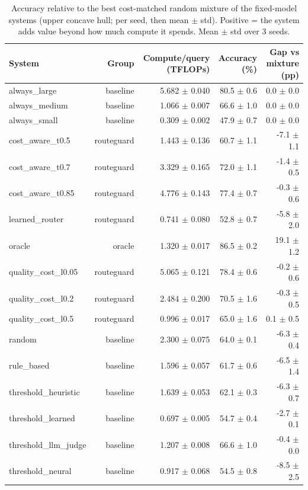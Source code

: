 \begin{table}[t]
\centering
\small
\caption{Accuracy relative to the best cost-matched random mixture of the fixed-model systems (upper concave hull; per seed, then mean $\pm$ std). Positive = the system adds value beyond how much compute it spends. Mean $\pm$ std over 3 seeds.}
\label{tab:cost_matched_mixture}
\begin{tabular}{lrrrr}
\toprule
System & Group & Compute/query (TFLOPs) & Accuracy (\%) & Gap vs mixture (pp) \\
\midrule
always\_large & baseline & 5.682 $\pm$ 0.040 & 80.5 $\pm$ 0.6 & 0.0 $\pm$ 0.0 \\
always\_medium & baseline & 1.066 $\pm$ 0.007 & 66.6 $\pm$ 1.0 & 0.0 $\pm$ 0.0 \\
always\_small & baseline & 0.309 $\pm$ 0.002 & 47.9 $\pm$ 0.7 & 0.0 $\pm$ 0.0 \\
cost\_aware\_t0.5 & routeguard & 1.443 $\pm$ 0.136 & 60.7 $\pm$ 1.1 & -7.1 $\pm$ 1.1 \\
cost\_aware\_t0.7 & routeguard & 3.329 $\pm$ 0.165 & 72.0 $\pm$ 1.1 & -1.4 $\pm$ 0.5 \\
cost\_aware\_t0.85 & routeguard & 4.776 $\pm$ 0.143 & 77.4 $\pm$ 0.7 & -0.3 $\pm$ 0.6 \\
learned\_router & routeguard & 0.741 $\pm$ 0.080 & 52.8 $\pm$ 0.7 & -5.8 $\pm$ 2.0 \\
oracle & oracle & 1.320 $\pm$ 0.017 & 86.5 $\pm$ 0.2 & 19.1 $\pm$ 1.2 \\
quality\_cost\_l0.05 & routeguard & 5.065 $\pm$ 0.121 & 78.4 $\pm$ 0.6 & -0.2 $\pm$ 0.6 \\
quality\_cost\_l0.2 & routeguard & 2.484 $\pm$ 0.200 & 70.5 $\pm$ 1.6 & -0.3 $\pm$ 0.5 \\
quality\_cost\_l0.5 & routeguard & 0.996 $\pm$ 0.017 & 65.0 $\pm$ 1.6 & 0.1 $\pm$ 0.5 \\
random & baseline & 2.300 $\pm$ 0.075 & 64.0 $\pm$ 0.1 & -6.3 $\pm$ 0.4 \\
rule\_based & baseline & 1.596 $\pm$ 0.057 & 61.7 $\pm$ 0.6 & -6.5 $\pm$ 1.4 \\
threshold\_heuristic & baseline & 1.639 $\pm$ 0.053 & 62.1 $\pm$ 0.3 & -6.3 $\pm$ 0.7 \\
threshold\_learned & baseline & 0.697 $\pm$ 0.005 & 54.7 $\pm$ 0.4 & -2.7 $\pm$ 0.1 \\
threshold\_llm\_judge & baseline & 1.207 $\pm$ 0.008 & 66.6 $\pm$ 1.0 & -0.4 $\pm$ 0.0 \\
threshold\_neural & baseline & 0.917 $\pm$ 0.068 & 54.5 $\pm$ 0.8 & -8.5 $\pm$ 2.5 \\
\bottomrule
\end{tabular}
\end{table}
